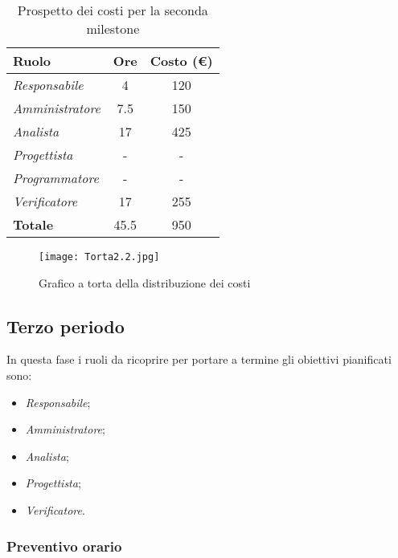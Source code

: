 \begin{table}[H]
    \centering
    \begin{tabular}{|l|c|c|}
    \hline
    \textbf{Ruolo} & \multicolumn{1}{l|}{\textbf{Ore}} & \multicolumn{1}{l|}{\textbf{Costo (€)}} \\ \hline
    \textit{Responsabile} & 4 & 120 \\ \hline
    \textit{Amministratore} & 7.5 & 150 \\ \hline
    \textit{Analista} & 17 & 425 \\ \hline
    \textit{Progettista} & - & - \\ \hline
    \textit{Programmatore} & - & - \\ \hline
    \textit{Verificatore} & 17 & 255 \\ \hline
    \textbf{Totale} & 45.5 & 950 \\ \hline
    \end{tabular}
    \caption{Prospetto dei costi per la seconda milestone}
\end{table}

\begin{figure}[H]
    \texttt{[image: Torta2.2.jpg]}
    \caption{Grafico a torta della distribuzione dei costi}
\end{figure}



\newpage
\subsection{Terzo periodo}

In questa fase i ruoli da ricoprire per portare a termine gli obiettivi
pianificati sono:
\begin{itemize}
    \item \textit{Responsabile};
    \item \textit{Amministratore};
    \item \textit{Analista};
    \item \textit{Progettista};
    \item \textit{Verificatore}.
\end{itemize}

\subsubsection{Preventivo orario}

